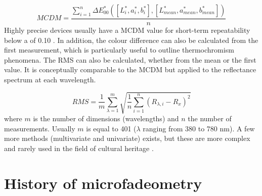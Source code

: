 \begin{equation}
    MCDM = \frac{\displaystyle\sum_{i=1}^{n} \Delta E^*_{00}([L^*_i,a^*_i,b^*_i],[L^*_{mean},a^*_{mean},b^*_{mean}])}{n}
\label{eq:MCDM}
\end{equation}
Highly precise devices usually have a \gls{MCDM} value for short-term repeatability below a \dEOO of 0.10 \citep[98]{berns_billmeyer_2000}. In addition, the colour difference can also be calculated from the first measurement, which is particularly useful to outline thermochromism phenomena. The \gls{RMS} can also be calculated, whether from the mean or the first value. It is conceptually comparable to the \gls{MCDM} but applied to the reflectance spectrum at each wavelength.

\begin{equation}
    RMS = \frac{1}{m} \displaystyle\sum_{\lambda=1}^{m} \sqrt{\frac{1}{n}\displaystyle\sum_{i=1}^{n}(R_{\lambda,i}-R_x)^2}
\end{equation}
where $m$ is the number of dimensions (\ie wavelengths) and $n$ the number of measurements. Usually $m$ is equal to 401 ($\lambda$ ranging from 380 to 780 nm). A few more methods (multivariate and univariate) exists, but these are more complex and rarely used in the field of cultural heritage \citep{clarke_recipe_2006, gardner_uncertainties_2006, wyble_evaluation_2007}.\\


\newpage
\section{History of microfadeometry}

